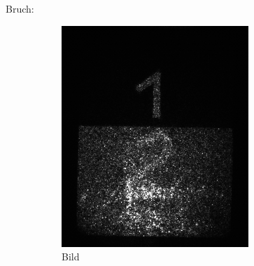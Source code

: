\documentclass[
	a4paper,
	12pt,
	pagesize,
	ngerman
]{scrartcl}
\begin{document}
	\vspace{0.5cm}
	\noindent Bruch:
	\begin{figure}[H]
        \centering
        \begin{subfigure}[b]{0.275\textwidth}
            \centering
            \includegraphics[width=\textwidth]{raw/4/4_halb_gitter}
            \caption%
            {Bild}
            \label{fig_4_halb_gitter}
        \end{subfigure}
				\hfill
        \begin{subfigure}[b]{0.275\textwidth}
            \centering

\end{subfigure}
\end{figure}
\end{document}

